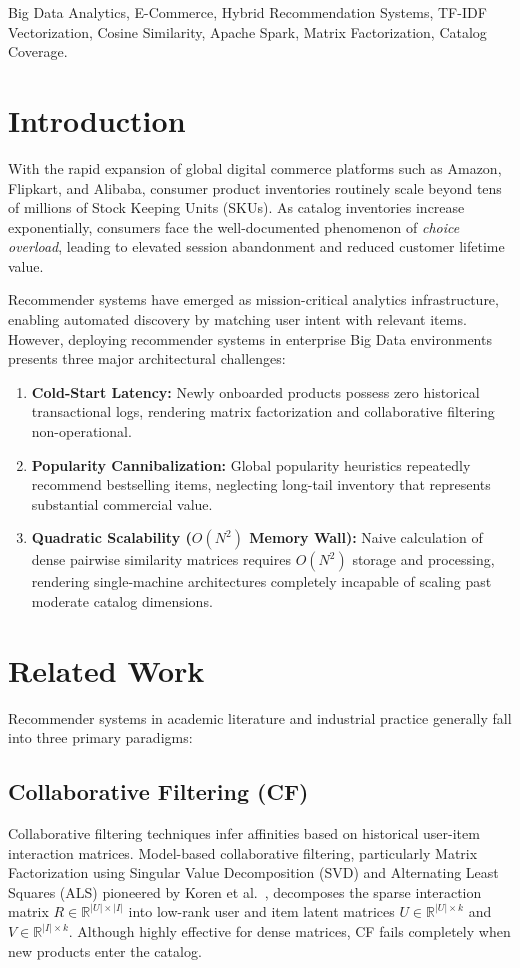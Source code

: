 \documentclass[conference]{IEEEtran}
\begin{document}
\begin{IEEEkeywords}
Big Data Analytics, E-Commerce, Hybrid Recommendation Systems, TF-IDF Vectorization, Cosine Similarity, Apache Spark, Matrix Factorization, Catalog Coverage.
\end{IEEEkeywords}

\section{Introduction}
With the rapid expansion of global digital commerce platforms such as Amazon, Flipkart, and Alibaba, consumer product inventories routinely scale beyond tens of millions of Stock Keeping Units (SKUs). As catalog inventories increase exponentially, consumers face the well-documented phenomenon of \textit{choice overload}, leading to elevated session abandonment and reduced customer lifetime value.

Recommender systems have emerged as mission-critical analytics infrastructure, enabling automated discovery by matching user intent with relevant items. However, deploying recommender systems in enterprise Big Data environments presents three major architectural challenges:
\begin{enumerate}
    \item \textbf{Cold-Start Latency:} Newly onboarded products possess zero historical transactional logs, rendering matrix factorization and collaborative filtering non-operational.
    \item \textbf{Popularity Cannibalization:} Global popularity heuristics repeatedly recommend bestselling items, neglecting long-tail inventory that represents substantial commercial value.
    \item \textbf{Quadratic Scalability ($O(N^2)$ Memory Wall):} Naive calculation of dense pairwise similarity matrices requires $O(N^2)$ storage and processing, rendering single-machine architectures completely incapable of scaling past moderate catalog dimensions.
\end{enumerate}

\section{Related Work}
Recommender systems in academic literature and industrial practice generally fall into three primary paradigms:

\subsection{Collaborative Filtering (CF)}
Collaborative filtering techniques infer affinities based on historical user-item interaction matrices. Model-based collaborative filtering, particularly Matrix Factorization using Singular Value Decomposition (SVD) and Alternating Least Squares (ALS) pioneered by Koren et al.~\cite{koren2009}, decomposes the sparse interaction matrix $R \in \mathbb{R}^{|U| \times |I|}$ into low-rank user and item latent matrices $U \in \mathbb{R}^{|U| \times k}$ and $V \in \mathbb{R}^{|I| \times k}$. Although highly effective for dense matrices, CF fails completely when new products enter the catalog.
\end{document}
